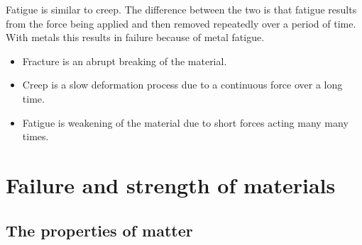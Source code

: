 Fatigue is similar to creep. The difference between the two is that fatigue results from the force being applied and then removed repeatedly over a period of time. With metals this results in failure because of metal fatigue. 

\begin{itemize}
\item Fracture is an abrupt breaking of the material.
\item Creep is a slow deformation process due to a continuous force over a long time.
\item Fatigue is weakening of the material due to short forces acting many many times.
\end{itemize}


\section{Failure and strength of materials}

\subsection{The properties of matter}

